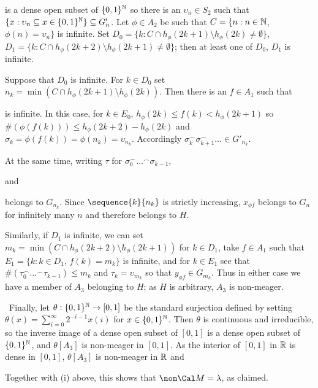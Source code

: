 {

\noindent is a dense open subset of $\{0,1\}^{\Bbb N}$ so there is an
$\upsilon_n\in S_2$ such that
$\{x:\upsilon_n\subseteq x\in\{0,1\}^{\Bbb N}\}\subseteq G'_n$.
Let $\phi\in A_2$ be such that $C=\{n:n\in\Bbb N$, $\phi(n)=\upsilon_n\}$
is infinite.   Set
$D_0=\{k:C\cap h_{\phi}(2k+1)\setminus h_{\phi}(2k)\ne\emptyset\}$,
$D_1=\{k:C\cap h_{\phi}(2k+2)\setminus h_{\phi}(2k+1)\ne\emptyset\}$;
then at least one of $D_0$, $D_1$ is infinite.

Suppose that $D_0$ is infinite.   For $k\in D_0$ set
$n_k=\min(C\cap h_{\phi}(2k+1)\setminus h_{\phi}(2k))$.  Then there is
an $f\in A_1$ such that


\noindent is infinite.   In this case,
for $k\in E_0$, $h_{\phi}(2k)\le f(k)<h_{\phi}(2k+1)$ so
$\#(\phi( f(k)))\le h_{\phi}(2k+2)-h_{\phi}(2k)$ and
$\sigma_k=\phi( f(k))=\phi(n_k)=\upsilon_{n_k}$.   Accordingly
$\sigma_k^{\smallfrown}\sigma_{k+1}^{\smallfrown}\ldots\in G'_{n_k}$.

At the same time, writing $\tau$ for
$\sigma_0^{\smallfrown}\ldots^{\smallfrown}\sigma_{k-1}$,


\noindent and


\noindent belongs to $G_{n_k}$.   Since $\sequence{k}{n_k}$ is strictly
increasing, $x_{\phi f}$ belongs to $G_n$ for infinitely many $n$ and
therefore belongs to $H$.

Similarly, if $D_1$ is infinite, we can set
$m_k=\min(C\cap h_{\phi}(2k+2)\setminus h_{\phi}(2k+1))$ for $k\in D_1$,
take $f\in A_1$ such that
$E_1=\{k:k\in D_1$, $f(k)=m_k\}$ is infinite, and for $k\in E_1$ see
that $\#(\tau_0^{\smallfrown}\ldots^{\smallfrown}\tau_{k-1})\le m_k$
and $\tau_k=\upsilon_{m_k}$ so that $y_{\phi f}\in G_{m_k}$.
Thus in either case we have a member of $A_3$
belonging to $H$;  as $H$ is arbitrary, $A_3$ is non-meager.\ \Qed

\medskip

\qquad\grheade\ Finally, let $\theta:\{0,1\}^{\Bbb N}\to[0,1]$ be the
standard surjection defined by setting
$\theta(x)=\sum_{i=0}^{\infty}2^{-i-1}x(i)$ for $x\in\{0,1\}^{\Bbb N}$.
Then $\theta$ is continuous and irreducible,
so the inverse image of a dense open subset of
$[0,1]$ is a dense open subset of $\{0,1\}^{\Bbb N}$, and $\theta[A_3]$ is
non-meager in $[0,1]$.   As the interior of $[0,1]$ in $\Bbb R$ is dense in
$[0,1]$, $\theta[A_3]$ is non-meager in $\Bbb R$ and


\noindent Together with (i) above, this shows that $\non\Cal M=\lambda$, as
claimed.
}%

